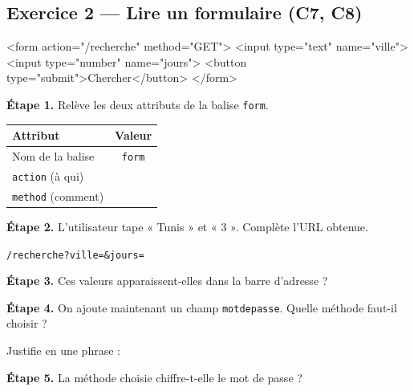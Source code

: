 \medskip
\begin{center}
 \qquad {} \qquad {}
\end{center}

\bigskip
\bigskip

\subsection*{Exercice 2 --- Lire un formulaire (C7, C8)}

\begin{console}
<form action="/recherche" method="GET">
  <input type="text" name="ville">
  <input type="number" name="jours">
  <button type="submit">Chercher</button>
</form>
\end{console}

\bigskip

\textbf{Étape 1.} Relève les deux attributs de la balise \texttt{form}.

\bigskip

\begin{center}
\begin{tabular}{|l|c|}
\hline
\textbf{Attribut} & \textbf{Valeur} \\
\hline
Nom de la balise & \texttt{form} \\
\hline
\texttt{action} (à qui) & \dotfill \\
\hline
\texttt{method} (comment) & \dotfill \\
\hline
\end{tabular}
\end{center}

\bigskip

\textbf{Étape 2.} L'utilisateur tape « Tunis » et « 3 ». Complète l'URL obtenue.

\medskip
\texttt{/recherche?ville=}\dotfill\texttt{\&jours=}\dotfill

\bigskip

\textbf{Étape 3.} Ces valeurs apparaissent-elles dans la barre d'adresse ?

\medskip
\begin{center}
 \qquad {}
\end{center}

\bigskip

\textbf{Étape 4.} On ajoute maintenant un champ \texttt{motdepasse}.
Quelle méthode faut-il choisir ?

\medskip
\begin{center}
 \qquad {}
\end{center}

\medskip
Justifie en une phrase : \dotfill

\bigskip

\textbf{Étape 5.} La méthode choisie chiffre-t-elle le mot de passe ?

\medskip
\begin{center}
 \qquad {}
\end{center}
